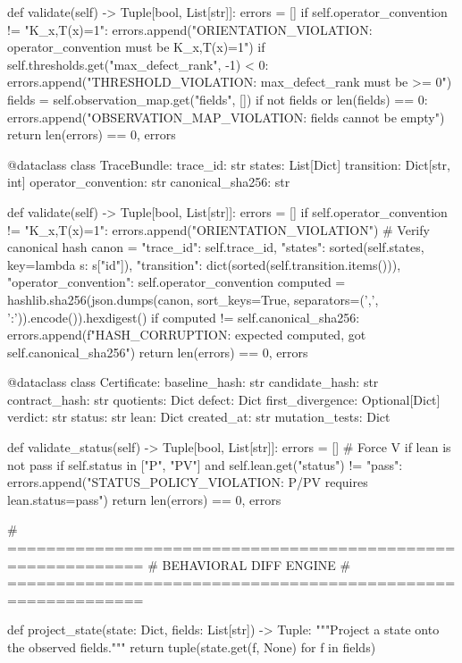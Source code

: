     def validate(self) -> Tuple[bool, List[str]]:
        errors = []
        if self.operator_convention != "K_x,T(x)=1":
            errors.append("ORIENTATION_VIOLATION: operator_convention must be K_x,T(x)=1")
        if self.thresholds.get("max_defect_rank", -1) < 0:
            errors.append("THRESHOLD_VIOLATION: max_defect_rank must be >= 0")
        fields = self.observation_map.get("fields", [])
        if not fields or len(fields) == 0:
            errors.append("OBSERVATION_MAP_VIOLATION: fields cannot be empty")
        return len(errors) == 0, errors

@dataclass  
class TraceBundle:
    trace_id: str
    states: List[Dict]
    transition: Dict[str, int]
    operator_convention: str
    canonical_sha256: str
    
    def validate(self) -> Tuple[bool, List[str]]:
        errors = []
        if self.operator_convention != "K_x,T(x)=1":
            errors.append("ORIENTATION_VIOLATION")
        # Verify canonical hash
        canon = {
            "trace_id": self.trace_id,
            "states": sorted(self.states, key=lambda s: s["id"]),
            "transition": dict(sorted(self.transition.items())),
            "operator_convention": self.operator_convention
        }
        computed = hashlib.sha256(json.dumps(canon, sort_keys=True, separators=(',', ':')).encode()).hexdigest()
        if computed != self.canonical_sha256:
            errors.append(f"HASH_CORRUPTION: expected {computed}, got {self.canonical_sha256}")
        return len(errors) == 0, errors

@dataclass
class Certificate:
    baseline_hash: str
    candidate_hash: str
    contract_hash: str
    quotients: Dict
    defect: Dict
    first_divergence: Optional[Dict]
    verdict: str
    status: str
    lean: Dict
    created_at: str
    mutation_tests: Dict
    
    def validate_status(self) -> Tuple[bool, List[str]]:
        errors = []
        # Force V if lean is not pass
        if self.status in ["P", "PV"] and self.lean.get("status") != "pass":
            errors.append("STATUS_POLICY_VIOLATION: P/PV requires lean.status=pass")
        return len(errors) == 0, errors

# ============================================================
# BEHAVIORAL DIFF ENGINE
# ============================================================

def project_state(state: Dict, fields: List[str]) -> Tuple:
    """Project a state onto the observed fields."""
    return tuple(state.get(f, None) for f in fields)

